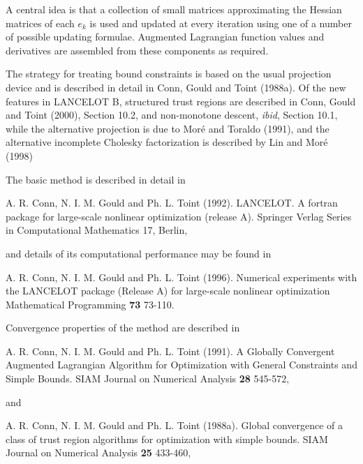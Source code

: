 \documentclass{galahad}
\begin{document}
A central idea is that a collection of small matrices approximating the
Hessian matrices of each $e_k$ is used and updated at every iteration
using one of a number of possible updating formulae.  Augmented
Lagrangian function values and derivatives are assembled from these
components as required.

The strategy for treating bound constraints is based on the usual
projection device and is described in detail in Conn, Gould and Toint (1988a).
Of the new features in LANCELOT B,
structured trust regions are described in
Conn, Gould and Toint (2000), Section 10.2, and
non-monotone descent, {\em ibid}, Section 10.1,
while the alternative projection is due to Mor\'{e} and Toraldo (1991),
and the alternative incomplete Cholesky factorization is
described by Lin and Mor\'{e} (1998)

\galreferences
\vspace*{1mm}

\noindent
The basic method is described in detail in
\vspace*{1mm}

\noindent
A. R. Conn, N. I. M. Gould and Ph. L. Toint (1992).
LANCELOT. A fortran package for large-scale nonlinear optimization
(release A). Springer Verlag Series in Computational Mathematics 17,
Berlin,

\noindent
and details of its computational performance may be found in

\noindent
A. R. Conn, N. I. M. Gould and Ph. L. Toint (1996).
Numerical experiments with the {\sf LANCELOT} package
(Release A) for large-scale nonlinear optimization
Mathematical Programming {\bf 73} 73-110.

Convergence properties of the method are described in

\noindent
A. R. Conn, N. I. M. Gould and Ph. L. Toint (1991).
A Globally Convergent Augmented {L}agrangian Algorithm for
Optimization with General Constraints and Simple Bounds.
SIAM Journal on Numerical Analysis {\bf 28} 545-572,

\noindent
and

\noindent
A. R. Conn, N. I. M. Gould and Ph. L. Toint (1988a).
Global convergence of a class of trust region algorithms
for optimization with simple bounds.
SIAM Journal on Numerical Analysis {\bf 25} 433-460,
\end{document}
